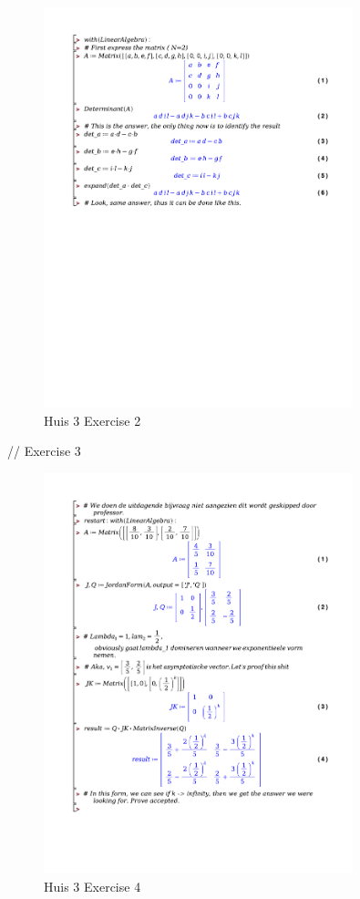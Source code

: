 \documentclass[a4paper]{article}
\begin{document}
\begin{figure}[H]
	\centering
	\includegraphics[width=0.8\textwidth]{exercises/huis_3_ex_2.pdf}
	\caption{Huis 3 Exercise 2}
	\label{fig:huis_3_ex_2_Maple}
\end{figure}

// Exercise 3


\begin{figure}[H]
	\centering
	\includegraphics[width=0.8\textwidth]{exercises/huis_3_ex_4.pdf}
	\caption{Huis 3 Exercise 4}
	\label{fig:huis_3_ex_4_Maple}
\end{figure}
\end{document}
